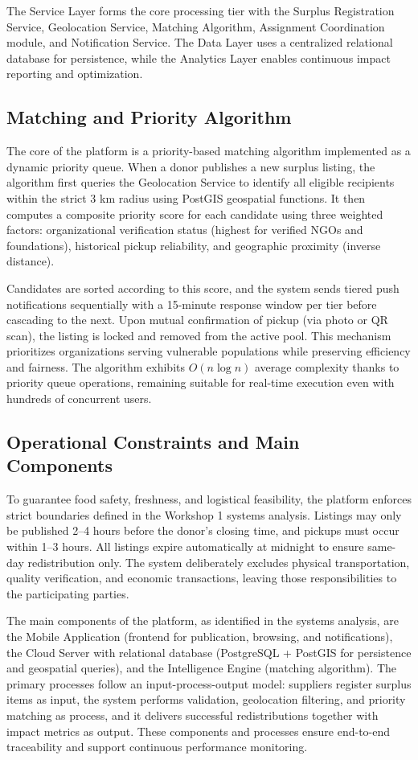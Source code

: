 \documentclass[conference]{IEEEtran}
\begin{document}
The Service Layer forms the core processing tier with the Surplus Registration Service, Geolocation Service, Matching Algorithm, Assignment Coordination module, and Notification Service. The Data Layer uses a centralized relational database for persistence, while the Analytics Layer enables continuous impact reporting and optimization.

\subsection{Matching and Priority Algorithm}
The core of the platform is a priority-based matching algorithm implemented as a dynamic priority queue. When a donor publishes a new surplus listing, the algorithm first queries the Geolocation Service to identify all eligible recipients within the strict 3 km radius using PostGIS geospatial functions. It then computes a composite priority score for each candidate using three weighted factors: organizational verification status (highest for verified NGOs and foundations), historical pickup reliability, and geographic proximity (inverse distance).

Candidates are sorted according to this score, and the system sends tiered push notifications sequentially with a 15-minute response window per tier before cascading to the next. Upon mutual confirmation of pickup (via photo or QR scan), the listing is locked and removed from the active pool. This mechanism prioritizes organizations serving vulnerable populations while preserving efficiency and fairness. The algorithm exhibits $O(n \log n)$ average complexity thanks to priority queue operations, remaining suitable for real-time execution even with hundreds of concurrent users.

\subsection{Operational Constraints and Main Components}
To guarantee food safety, freshness, and logistical feasibility, the platform enforces strict boundaries defined in the Workshop 1 systems analysis. Listings may only be published 2--4 hours before the donor’s closing time, and pickups must occur within 1--3 hours. All listings expire automatically at midnight to ensure same-day redistribution only. The system deliberately excludes physical transportation, quality verification, and economic transactions, leaving those responsibilities to the participating parties.

The main components of the platform, as identified in the systems analysis, are the Mobile Application (frontend for publication, browsing, and notifications), the Cloud Server with relational database (PostgreSQL + PostGIS for persistence and geospatial queries), and the Intelligence Engine (matching algorithm). The primary processes follow an input-process-output model: suppliers register surplus items as input, the system performs validation, geolocation filtering, and priority matching as process, and it delivers successful redistributions together with impact metrics as output. These components and processes ensure end-to-end traceability and support continuous performance monitoring.
\end{document}
